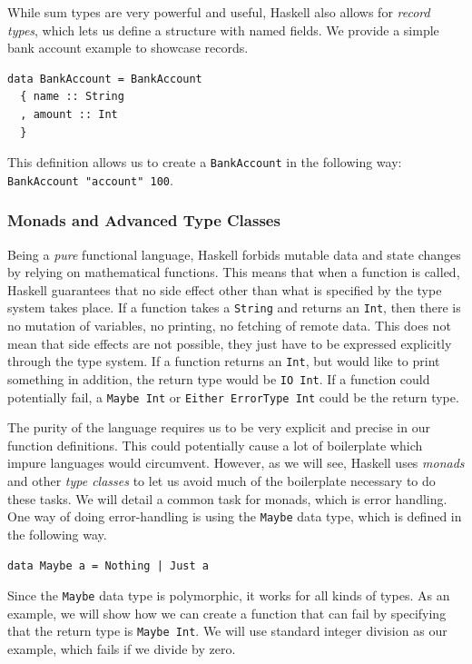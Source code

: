 \documentclass[a4paper,english]{ifimaster}
\begin{document}
While sum types are very powerful and useful, Haskell also allows for \textit{record types}, which lets us define a structure with named fields. We provide a simple bank account example to showcase records.

\begin{verbatim}
data BankAccount = BankAccount
  { name :: String
  , amount :: Int
  }
\end{verbatim}

This definition allows us to create a \texttt{BankAccount} in the following way: \texttt{BankAccount "account" 100}.

\subsubsection{Monads and Advanced Type Classes}%
\label{ssub:monads_and_advanced_type_classes}

Being a \textit{pure} functional language, Haskell forbids mutable data and state changes by relying on mathematical functions. This means that when a function is called, Haskell guarantees that no side effect other than what is specified by the type system takes place. If a function takes a \texttt{String} and returns an \texttt{Int}, then there is no mutation of variables, no printing, no fetching of remote data. This does not mean that side effects are not possible, they just have to be expressed explicitly through the type system. If a function returns an \texttt{Int}, but would like to print something in addition, the return type would be \texttt{IO Int}. If a function could potentially fail, a \texttt{Maybe Int} or \texttt{Either ErrorType Int} could be the return type.

The purity of the language requires us to be very explicit and precise in our function definitions. This could potentially cause a lot of boilerplate which impure languages would circumvent. However, as we will see, Haskell uses \textit{monads} and other \textit{type classes} to let us avoid much of the boilerplate necessary to do these tasks. We will detail a common task for monads, which is error handling. One way of doing error-handling is using the \texttt{Maybe} data type, which is defined in the following way.

\begin{verbatim}
data Maybe a = Nothing | Just a
\end{verbatim}

Since the \texttt{Maybe} data type is polymorphic, it works for all kinds of types. As an example, we will show how we can create a function that can fail by specifying that the return type is \texttt{Maybe Int}. We will use standard integer division as our example, which fails if we divide by zero.
\end{document}

